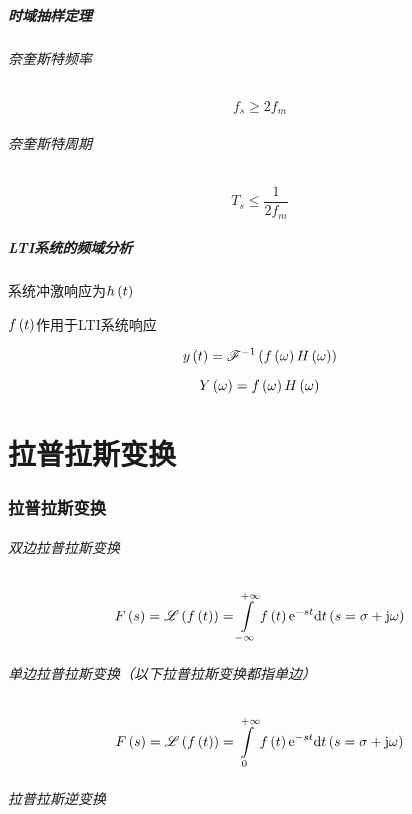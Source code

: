 \documentclass{article}
\begin{document}
\subsubsection{时域抽样定理}

\paragraph{奈奎斯特频率}

\[f_s\geqslant2f_m\]

\paragraph{奈奎斯特周期}

\[T_s\leqslant\frac1{2f_m}\]

\subsubsection{LTI系统的频域分析}

系统冲激响应为$h\left(t\right)$

$f\left(t\right)$作用于LTI系统响应

\[y\left(t\right)=\mathscr F^{-1}\left(f\left(\omega\right)H\left(\omega\right)\right)\]

\[Y\left(\omega\right)=f\left(\omega\right)H\left(\omega\right)\]

\part{拉普拉斯变换}

\section{拉普拉斯变换}

\paragraph{双边拉普拉斯变换}

\[\fs=\laplace{\ft}=\impint\ft\e^{-st}\d t\pare{s=\sigma+\j\omega}\]

\paragraph{单边拉普拉斯变换（以下拉普拉斯变换都指单边）}

\[F\left(s\right)=\mathscr L\left(f\left(t\right)\right)=\int\limits_0^{+\infty}f\left(t\right)\mathrm e^{-st}\mathrm d t\left(s=\sigma+\mathrm j\omega\right)\]

\paragraph{拉普拉斯逆变换}
\end{document}
